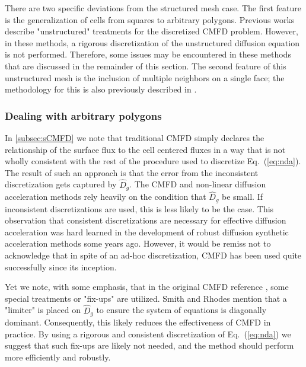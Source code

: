 \documentclass{anstrans}
\renewcommand{\eqref}[1]{Eq.~(\ref{#1})}
\begin{document}
There are two specific deviations from the structured mesh case. The first feature is the generalization of cells from squares to arbitrary polygons. Previous works \cite{CHO2008,Kim2011} describe "unstructured" treatments for the discretized CMFD problem. However, in these methods, a rigorous discretization of the unstructured diffusion equation is not performed. Therefore, some issues may be encountered in these methods that are discussed in the remainder of this section. The second feature of this unstructured mesh is the inclusion of multiple neighbors on a single face; the methodology for this is also previously described in \cite{Thomas2006}.

\subsubsection{Dealing with arbitrary polygons}
In \ref{subsec:sCMFD} we note that traditional CMFD simply declares the relationship of the surface flux to the cell centered fluxes in a way that is not wholly consistent with the rest of the procedure used to discretize \eqref{eq:nda}. The result of such an approach is that the error from the inconsistent discretization gets captured by $\hat D_g$. The CMFD and non-linear diffusion acceleration methods rely heavily on the condition that $\hat D_g$ be small. If inconsistent discretizations are used, this is less likely to be the case. This observation that consistent discretizations are necessary for effective diffusion acceleration was hard learned in the development of robust diffusion synthetic acceleration methods some years ago. However, it would be remiss not to acknowledge that in spite of an ad-hoc discretization, CMFD has been used quite successfully since its inception.

Yet we note, with some emphasis, that in the original CMFD reference \cite{Smith2002}, some special treatments or "fix-ups" are utilized. Smith and Rhodes mention that a "limiter" is placed on $\hat D_g$ to ensure the system of equations is diagonally dominant. Consequently, this likely reduces the effectiveness of CMFD in practice. By using a rigorous and consistent discretization of \eqref{eq:nda} we suggest that such fix-ups are likely not needed, and the method should perform more efficiently and robustly.
\end{document}
